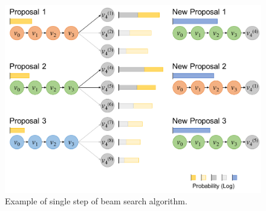 \begin{figure}[!h]
	\centering
	\includegraphics[width=\fig\textwidth]{4-05.pdf}
    \caption[Example of single step of beam search algorithm]{Example of single step of beam search algorithm.}
	\label{fig:egbmsrch}
\end{figure}